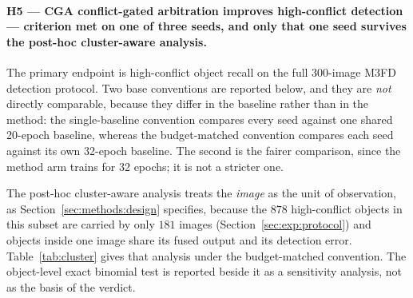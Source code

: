 \documentclass[pdflatex,sn-mathphys-num]{sn-jnl}
\theoremstyle{thmstyleone}%
\theoremstyle{thmstyletwo}%
\theoremstyle{thmstylethree}%
\begin{document}
\paragraph{H5 --- CGA conflict-gated arbitration improves high-conflict detection --- criterion met on one of three seeds, and only that one seed survives the post-hoc cluster-aware analysis.}
The primary endpoint is high-conflict object recall on the full 300-image M3FD detection protocol. Two base conventions are reported below, and they are \emph{not} directly comparable, because they differ in the baseline rather than in the method: the single-baseline convention compares every seed against one shared 20-epoch baseline, whereas the budget-matched convention compares each seed against its own 32-epoch baseline. The second is the fairer comparison, since the method arm trains for 32 epochs; it is not a stricter one.

The post-hoc cluster-aware analysis treats the \emph{image} as the unit of observation, as Section~\ref{sec:methods:design} specifies, because the $878$ high-conflict objects in this subset are carried by only $181$ images (Section~\ref{sec:exp:protocol}) and objects inside one image share its fused output and its detection error. Table~\ref{tab:cluster} gives that analysis under the budget-matched convention. The object-level exact binomial test is reported beside it as a sensitivity analysis, not as the basis of the verdict.
\end{document}
